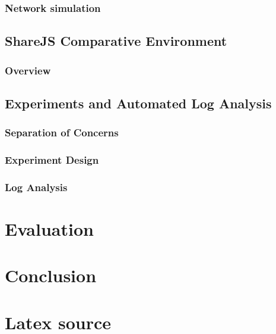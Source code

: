 \documentclass[12pt,a4paper,twoside,openright]{report}
\begin{document}
	\subsection{Network simulation}
	
\section{ShareJS Comparative Environment}

	\subsection{Overview}
	
\section{Experiments and Automated Log Analysis}

	\subsection{Separation of Concerns}
	
	\subsection{Experiment Design}
	
	\subsection{Log Analysis}
	

\chapter{Evaluation}


\chapter{Conclusion}



\printbibliography

\appendix

\chapter{Latex source}
\end{document}

